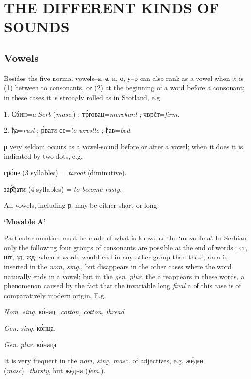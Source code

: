 
\vspace*{16pt}
\chapter{THE DIFFERENT KINDS OF SOUNDS}
\section{Vowels}

Besides the five normal vowels--а, е, и, о, у--р can also rank as a vowel when
it is (1) between to consonants, or (2) at the beginning of a word before a
consonant; in these cases it is strongly rolled as in Scotland, e.g.

1. Сбин=\emph{a Serb} (\emph{masc.}) ;
т\`{р}говац=\emph{merchant} ; чв\~{р}ст=\emph{firm}.

2. ђа=\emph{rust} ; \`{р}вати се=\emph{to wrestle} ;
ђав=\emph{bad}.

р  very seldom occurs as a vowel-sound before or after a vowel; when it does it
is  indicated by two dots, e.g.
\newpage

г\"{р}\'{о}це (3 syllables) = \emph{throat} (diminutive).

за\`{\"{р}}ђати (4 syllables) = \emph{to become rusty}.

All vowels, including р, may be either short or long.

\smallskip
{\hfill \large \textbf{`Movable A'} \hfill}

Particular mention must be made of what is knows as the `movable a'. In Serbian
only the following four groups of consonants are possible at the end of words :
ст, шт, зд, жд; when a words would end in any other group than these, an a is
inserted in the \emph{nom, sing.}, but disappears in the other cases where the
word naturally ends in a vowel; but in the \emph{gen. plur.} the a reappears in
these words, a phenomenon caused by the fact that the invariable long
\emph{final} a of this case is of comparatively modern origin.  E.g.

\emph{Nom. sing.} к\`{о}нац=\emph{cotton, cotton, thread}

\emph{Gen. sing.} к\'{о}нца.

\emph{Gen. plur.} к\`{о}н\={а}ц\={а}

It is very frequent in the \emph{nom, sing. masc.} of adjectives, e.g.
ж\'{е}дан (\emph{masc})=\emph{thirsty}, but ж\'{е}дна (\textit{fem.}).


